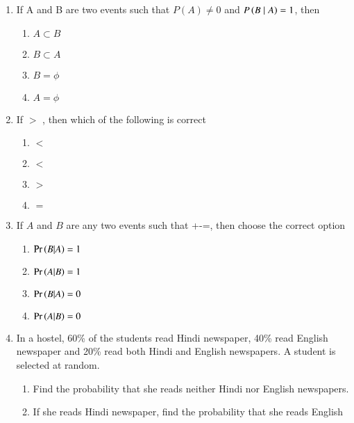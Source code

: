 \begin{enumerate}[resume*]
		
	\item If A and B are two events such that $P(A) \neq 0$ and $P\left(B\mid A\right) = 1$, then
\begin{enumerate}
\item $A \subset B$\\
\item $B\subset A$\\
\item $B = \phi$\\
\item $A = \phi$\\
\end{enumerate}
		\solution
		
	\item If  $>$ , then which of the following is correct 
\begin{enumerate}
 \item {} $<$  \\
 \item {} $<$     \\
 \item {} $>$  \label{eq:ncert/12/13/6/18/c}\\ 
 \item {} $=$  \\
\end{enumerate}

		\solution
		
	\item If $A$ and $B$ are any two events such that +-=, then choose the correct option
\begin{enumerate}
\item  $\Pr\left(B|A\right)=1$
\item $\Pr\left(A|B\right)=1$
	\label{prob:12/13/6/19}
\item $\Pr\left(B|A\right)=0$
\item $\Pr\left(A|B\right)=0$
\end{enumerate}
		\solution
		
  \item
  In a hostel, 60\% of the students read Hindi newspaper, 40\% read English
newspaper and 20\% read both Hindi and English newspapers. A student is
selected at random.
\begin{enumerate}
\item Find the probability that she reads neither Hindi nor English newspapers.
\item If she reads Hindi newspaper, find the probability that she reads English

\end{enumerate}
\end{enumerate}

